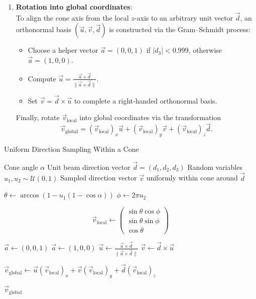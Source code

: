 \begin{enumerate}
    \item \textbf{Rotation into global coordinates}:\\
    To align the cone axis from the local $z$-axis to an arbitrary unit vector
    $\vec{d}$, an orthonormal basis $(\vec{u}, \vec{v}, \vec{d})$ is constructed
    via the Gram–Schmidt process:
    \begin{itemize}
        \item Choose a helper vector $\vec{a} = (0,0,1)$ if $|d_3| < 0.999$,
        otherwise $\vec{a} = (1,0,0)$.
        \item Compute $\vec{u} = \frac{\vec{a} \times \vec{d}}{\|\vec{a} \times
        \vec{d}\|}$.
        \item Set $\vec{v} = \vec{d} \times \vec{u}$ to complete a right-handed
        orthonormal basis.
    \end{itemize}
    Finally, rotate $\vec{v}_{\text{local}}$ into global coordinates via the
    transformation
    \[
        \vec{v}_{\text{global}} = (\vec{v}_{\text{local}})_x \vec{u} + (\vec{v}_{\text{local}})_y \vec{v} + (\vec{v}_{\text{local}})_z \vec{d}.
    \]
\end{enumerate}


\begin{algorithm}[H]
\caption{Uniform Direction Sampling Within a Cone}
\label{alg:uniformDirectionSampling}
\begin{algorithmic}[1]
\Require Cone angle $\alpha$
\Require Unit beam direction vector $\vec{d} = (d_1, d_2, d_3)$
\Require Random variables $u_1, u_2 \sim \mathcal{U}(0,1)$
\Ensure Sampled direction vector $\vec{v}$ uniformly within cone around
$\vec{d}$


\State $\theta \gets \arccos(1 - u_1 (1 - \cos \alpha))$ 
\State $\phi \gets 2\pi u_2$ 


\State $$\vec{v}_{\text{local}} \gets 
\begin{pmatrix}
\sin\theta \cos\phi \\
\sin\theta \sin\phi \\
\cos\theta \end{pmatrix}$$

    \State $\vec{a} \gets (0, 0, 1)$
\Else
    \State $\vec{a} \gets (1, 0, 0)$
\EndIf
\State $\vec{u} \gets \frac{\vec{a} \times \vec{d}}{\|\vec{a} \times \vec{d}\|}$ 
\State $\vec{v} \gets \vec{d} \times \vec{u}$ 

\State $\vec{v}_{\text{global}} \gets \vec{u} (\vec{v}_{\text{local}})_x + \vec{v} (\vec{v}_{\text{local}})_y + \vec{d} (\vec{v}_{\text{local}})_z$

\State \Return $\vec{v}_{\text{global}}$

\end{algorithmic}
\end{algorithm}


